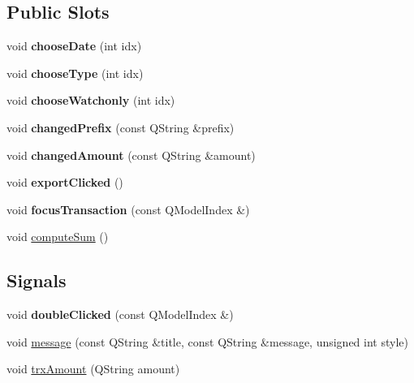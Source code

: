\subsection*{Public Slots}
\begin{DoxyCompactItemize}
\item 
\mbox{\label{class_transaction_view_abd49a0777b14f7bf5a72a4d5901d033d}} 
void {\bfseries choose\+Date} (int idx)
\item 
\mbox{\label{class_transaction_view_a590f0edc4ab4d59f88d7fc494e852f80}} 
void {\bfseries choose\+Type} (int idx)
\item 
\mbox{\label{class_transaction_view_a0f3b9936adcb622403210e7b38a64574}} 
void {\bfseries choose\+Watchonly} (int idx)
\item 
\mbox{\label{class_transaction_view_ac2ed41556913e588c667490860717efa}} 
void {\bfseries changed\+Prefix} (const Q\+String \&prefix)
\item 
\mbox{\label{class_transaction_view_a0075048c06bb54da5c5e5d2691198984}} 
void {\bfseries changed\+Amount} (const Q\+String \&amount)
\item 
\mbox{\label{class_transaction_view_a5983022ff1e5395f87de3c5728eff8da}} 
void {\bfseries export\+Clicked} ()
\item 
\mbox{\label{class_transaction_view_ab6d126806467ae9dc273cbe19a7477cc}} 
void {\bfseries focus\+Transaction} (const Q\+Model\+Index \&)
\item 
void \mbox{\hyperlink{class_transaction_view_abb2ea48a61bb12a0dda9d63952adc50e}{compute\+Sum}} ()
\end{DoxyCompactItemize}
\subsection*{Signals}
\begin{DoxyCompactItemize}
\item 
\mbox{\label{class_transaction_view_ad7f18fdb4db9a4a307eeba8bf1fec4e3}} 
void {\bfseries double\+Clicked} (const Q\+Model\+Index \&)
\item 
void \mbox{\hyperlink{class_transaction_view_a56d909951088cfc74b8b18fc2693e3b1}{message}} (const Q\+String \&title, const Q\+String \&message, unsigned int style)
\item 
void \mbox{\hyperlink{class_transaction_view_a139ef5288ce13ce14c17907b4d80c0e8}{trx\+Amount}} (Q\+String amount)
\end{DoxyCompactItemize}
